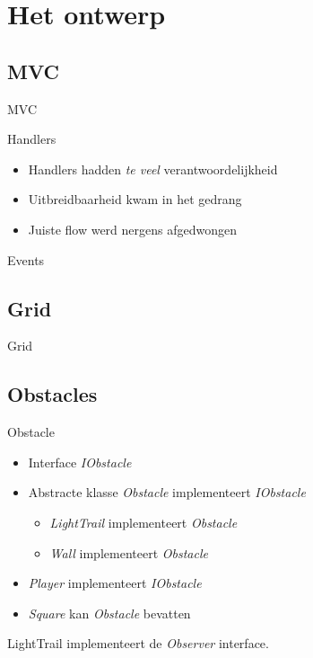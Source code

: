 \documentclass[t]{beamer}
\begin{document}
\section{Het ontwerp}
\subsection{MVC}

\begin{frame}{MVC}
\begin{center}
\end{center}
\end{frame}


\begin{frame}{Handlers}
\begin{center}
\end{center}
\begin{itemize}
	\item Handlers hadden \textit{te veel} verantwoordelijkheid
	\item Uitbreidbaarheid kwam in het gedrang
	\item Juiste flow werd nergens afgedwongen
\end{itemize}
\end{frame}


\begin{frame}{Events}

\end{frame}

\subsection{Grid}
\begin{frame}{Grid}
\begin{center}
\end{center}
\end{frame}


\subsection{Obstacles}
\begin{frame}{Obstacle}
\begin{center}
\begin{itemize}
	\item Interface \textit{IObstacle}
	\item  Abstracte klasse \textit{Obstacle} implementeert \textit{IObstacle}
	\begin{itemize}
		\item \textit{LightTrail} implementeert \textit{Obstacle}
		\item \textit{Wall} implementeert \textit{Obstacle}
	\end{itemize}
	\item \textit{Player} implementeert \textit{IObstacle}
	\item \textit{Square} kan \textit{Obstacle} bevatten
\end{itemize}
LightTrail implementeert de \textit{Observer} interface.
\end{center}
\end{frame}
\end{document}
